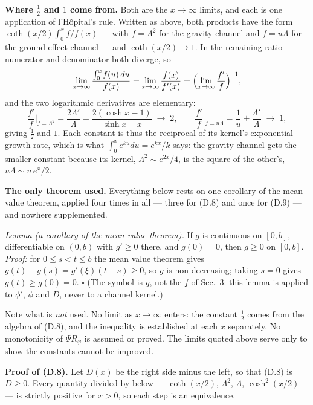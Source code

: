 \documentclass[11pt]{article}
\begin{document}
\textbf{Where $\tfrac12$ and $1$ come from.} Both are the $x\to\infty$
limits, and each is one application of l'H\^opital's rule. Written as
above, both products have the form $\coth(x/2)\int_0^x\!f/f(x)$ --- with
$f = \Lambda^2$ for the gravity channel and $f = u\Lambda$ for the
ground-effect channel --- and $\coth(x/2)\to1$. In the remaining ratio
numerator and denominator both diverge, so
\[
  \lim_{x\to\infty}\frac{\int_0^x\!f(u)\,du}{f(x)}
  = \lim_{x\to\infty}\frac{f(x)}{f'(x)}
  = \Bigl(\lim_{x\to\infty}\frac{f'}{f}\Bigr)^{\!-1},
\]
and the two logarithmic derivatives are elementary:
\[
  \frac{f'}{f}\bigg|_{f=\Lambda^2} = \frac{2\Lambda'}{\Lambda}
  = \frac{2(\cosh x - 1)}{\sinh x - x}\;\longrightarrow\;2,
  \qquad
  \frac{f'}{f}\bigg|_{f=u\Lambda} = \frac1u + \frac{\Lambda'}{\Lambda}
  \;\longrightarrow\;1,
\]
giving $\tfrac12$ and $1$. Each constant is thus the reciprocal of its
kernel's exponential growth rate, which is what $\int_0^xe^{ku}du =
e^{kx}/k$ says: the gravity channel gets the smaller constant because
its kernel, $\Lambda^2\sim e^{2x}/4$, is the square of the other's,
$u\Lambda\sim u\,e^{x}/2$.

\textbf{The only theorem used.} Everything below rests on one
corollary of the mean value theorem, applied four times in all --- three
for (D.8) and once for (D.9) --- and nowhere supplemented.

\emph{Lemma (a corollary of the mean value theorem).} If $g$ is
continuous on $[0,b]$, differentiable on $(0,b)$ with $g'\ge0$ there,
and $g(0) = 0$, then $g\ge0$ on $[0,b]$. \emph{Proof:} for
$0\le s<t\le b$ the mean value theorem gives $g(t)-g(s) =
g'(\xi)(t-s)\ge0$, so $g$ is non-decreasing; taking $s=0$ gives
$g(t)\ge g(0)=0$. $\square$ (The symbol is $g$, not the $f$ of
Sec.~3: this lemma is applied to $\phi'$, $\phi$ and $D$, never to a
channel kernel.)

Note what is \emph{not} used. No limit as $x\to\infty$ enters: the
constant $\tfrac12$ comes from the algebra of (D.8), and the
inequality is established at each $x$ separately. No monotonicity of
$\Psi R_\varphi$ is assumed or proved. The limits quoted above serve
only to show the constants cannot be improved.

\textbf{Proof of (D.8).} Let $D(x)$ be the right side minus the left,
so that (D.8) is $D\ge0$. Every quantity divided by below ---
$\coth(x/2)$, $\Lambda^2$, $\Lambda$, $\cosh^2(x/2)$ --- is strictly
positive for $x>0$, so each step is an equivalence.
\end{document}
